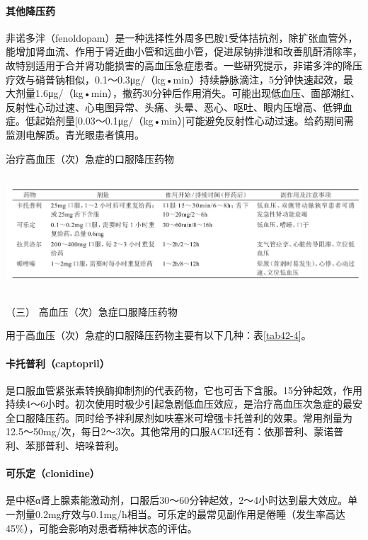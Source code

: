 \paragraph{其他降压药}

非诺多泮（fenoldopam）是一种选择性外周多巴胺1受体拮抗剂，除扩张血管外，能增加肾血流、作用于肾近曲小管和远曲小管，促进尿钠排泄和改善肌酐清除率，故特别适用于合并肾功能损害的高血压急症患者。一些研究提示，非诺多泮的降压疗效与硝普钠相似，0.1～0.3μg/（kg•min）持续静脉滴注，5分钟快速起效，最大剂量1.6μg/（kg•min），撤药30分钟后作用消失。可能出现低血压、面部潮红、反射性心动过速、心电图异常、头痛、头晕、恶心、呕吐、眼内压增高、低钾血症。低起始剂量{[}0.03～0.1μg/（kg•min）{]}可能避免反射性心动过速。给药期间需监测电解质。青光眼患者慎用。

\begin{table}[htbp]
\centering
\caption{治疗高血压（次）急症的口服降压药物}
\label{tab42-4}
\includegraphics[width=6.64583in,height=1.70833in]{./images/Image00163.jpg}
\end{table}

\hypertarget{text00108.htmlux5cux23CHP4-7-3-2-3}{}
（三） 高血压（次）急症口服降压药物

用于高血压（次）急症的口服降压药物主要有以下几种：表\ref{tab42-4}。

\paragraph{卡托普利（captopril）}

是口服血管紧张素转换酶抑制剂的代表药物，它也可舌下含服。15分钟起效，作用持续4～6小时。初次使用时极少引起急剧低血压效应，是治疗高血压次急症的最安全口服降压药。同时给予袢利尿剂如呋塞米可增强卡托普利的效果。常用剂量为12.5～50mg/次，每日2～3次。其他常用的口服ACEI还有：依那普利、蒙诺普利、苯那普利、培哚普利。

\paragraph{可乐定（clonidine）}

是中枢α肾上腺素能激动剂，口服后30～60分钟起效，2～4小时达到最大效应。单一剂量0.2mg疗效与0.1mg/h相当。可乐定的最常见副作用是倦睡（发生率高达45\%），可能会影响对患者精神状态的评估。

